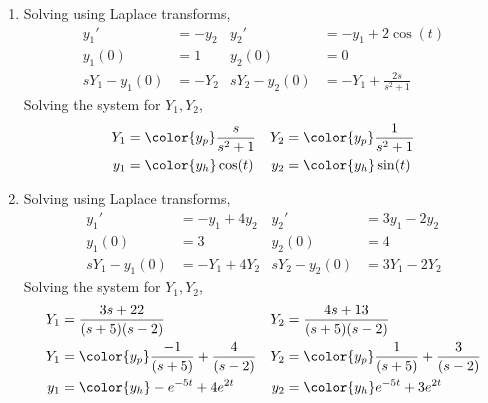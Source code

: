 \begin{enumerate}
    \item Solving using Laplace transforms,
          \begin{align}
              y_1'          & = -y_2                      &
              y_2'          & = -y_1 + 2\cos(t)             \\
              y_1(0)        & = 1                         &
              y_2(0)        & = 0                           \\
              sY_1 - y_1(0) & = -Y_2                      &
              sY_2 - y_2(0) & = -Y_1 + \frac{2s}{s^2 + 1}
          \end{align}
          Solving the system for $ Y_1, Y_2 $,
          \begin{align}
              Y_1 & = \color{y_p} \frac{s}{s^2 + 1} &
              Y_2 & = \color{y_p} \frac{1}{s^2 + 1}   \\
              y_1 & = \color{y_h} \cos(t)           &
              y_2 & = \color{y_h} \sin(t)
          \end{align}

    \item Solving using Laplace transforms,
          \begin{align}
              y_1'          & = -y_1 + 4y_2 &
              y_2'          & = 3y_1 - 2y_2   \\
              y_1(0)        & = 3           &
              y_2(0)        & = 4             \\
              sY_1 - y_1(0) & = -Y_1 + 4Y_2 &
              sY_2 - y_2(0) & = 3Y_1 - 2Y_2
          \end{align}
          Solving the system for $ Y_1, Y_2 $,
          \begin{align}
              Y_1 & = \frac{3s + 22}{(s+5)(s-2)}                       &
              Y_2 & = \frac{4s + 13}{(s+5)(s-2)}                         \\
              Y_1 & = \color{y_p} \frac{-1}{(s+5)} + \frac{4}{(s - 2)} &
              Y_2 & = \color{y_p} \frac{1}{(s+5)} + \frac{3}{(s - 2)}    \\
              y_1 & = \color{y_h} -e^{-5t} + 4e^{2t}                   &
              y_2 & = \color{y_h} e^{-5t} + 3e^{2t}
          \end{align}


\end{enumerate}
